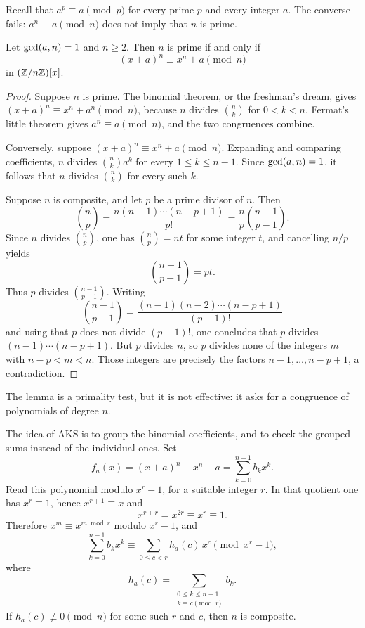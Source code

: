 Recall that \(a^{p}\equiv a\pmod{p}\) for every prime \(p\) and every integer \(a\). The converse fails: \(a^{n}\equiv a\pmod{n}\) does not imply that \(n\) is prime.


\begin{lemma}[AKS]
Let \(\operatorname{gcd}(a,n)=1\) and \(n\ge 2\). Then \(n\) is prime if and only if
\[
    (x+a)^{n}\equiv x^{n}+a\pmod{n}
\]
in \((\mathbb Z/n\mathbb Z)[x]\).
\end{lemma}

\begin{proof}
Suppose \(n\) is prime. The binomial theorem, or the freshman's dream, gives \((x+a)^{n}\equiv x^{n}+a^{n}\pmod{n}\), because \(n\) divides \(\binom{n}{k}\) for \(0<k<n\). Fermat's little theorem gives \(a^{n}\equiv a\pmod{n}\), and the two congruences combine.

Conversely, suppose \((x+a)^{n}\equiv x^{n}+a\pmod{n}\). Expanding and comparing coefficients, \(n\) divides \(\binom{n}{k}a^{k}\) for every \(1\le k\le n-1\). Since \(\operatorname{gcd}(a,n)=1\), it follows that \(n\) divides \(\binom{n}{k}\) for every such \(k\).

Suppose \(n\) is composite, and let \(p\) be a prime divisor of \(n\). Then
\[
    \binom{n}{p}
    =\frac{n(n-1)\cdots(n-p+1)}{p!}
    =\frac{n}{p}\binom{n-1}{p-1}.
\]
Since \(n\) divides \(\binom{n}{p}\), one has \(\binom{n}{p}=nt\) for some integer \(t\), and cancelling \(n/p\) yields
\[
    \binom{n-1}{p-1}=pt.
\]
Thus \(p\) divides \(\binom{n-1}{p-1}\). Writing
\[
    \binom{n-1}{p-1}
    =\frac{(n-1)(n-2)\cdots(n-p+1)}{(p-1)!}
\]
and using that \(p\) does not divide \((p-1)!\), one concludes that \(p\) divides \({(n-1)\cdots(n-p+1)}\). But \(p\) divides \(n\), so \(p\) divides none of the integers \(m\) with \(n-p<m<n\). Those integers are precisely the factors \(n-1,\ldots,n-p+1\), a contradiction.
\end{proof}


\begin{remark}
The lemma is a primality test, but it is not effective: it asks for a congruence of polynomials of degree \(n\).
\end{remark}

The idea of AKS is to group the binomial coefficients, and to check the grouped sums instead of the individual ones. Set
\[
    f_{a}(x)=(x+a)^{n}-x^{n}-a=\sum_{k=0}^{n-1}b_{k}x^{k}.
\]
Read this polynomial modulo \(x^{r}-1\), for a suitable integer \(r\). In that quotient one has \(x^{r}\equiv 1\), hence \(x^{r+1}\equiv x\) and
\[
    x^{r+r}=x^{2r}\equiv x^{r}\equiv 1.
\]
Therefore \(x^{m}\equiv x^{m\bmod r}\) modulo \(x^{r}-1\), and
\[
    \sum_{k=0}^{n-1}b_{k}x^{k}
    \equiv\sum_{0\le c<r}h_{a}(c)\,x^{c}
    \pmod{x^{r}-1},
\]
where
\[
    h_{a}(c)
    =\sum_{\substack{0\le k\le n-1\\ k\equiv c\pmod{r}}}b_{k}.
\]
If \(h_{a}(c)\not\equiv 0\pmod{n}\) for some such \(r\) and \(c\), then \(n\) is composite.


